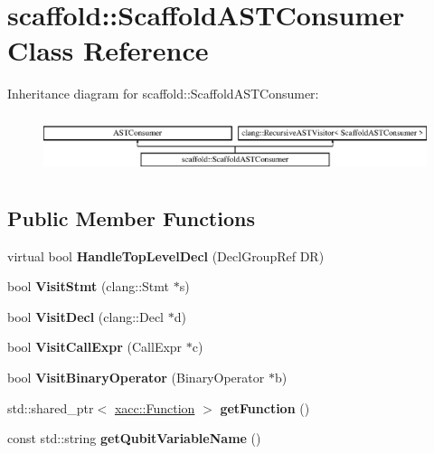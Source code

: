 \hypertarget{a01232}{}\section{scaffold\+:\+:Scaffold\+A\+S\+T\+Consumer Class Reference}
\label{a01232}
Inheritance diagram for scaffold\+:\+:Scaffold\+A\+S\+T\+Consumer\+:\begin{figure}[H]
\begin{center}
\leavevmode
\includegraphics[height=1.717791cm]{a01232}
\end{center}
\end{figure}
\subsection*{Public Member Functions}
\begin{DoxyCompactItemize}
\item 
\mbox{\label{a01232_a14020b09423a4efb0f992ace1d482a57}} 
virtual bool {\bfseries Handle\+Top\+Level\+Decl} (Decl\+Group\+Ref DR)
\item 
\mbox{\label{a01232_a3269dcedd2f3175837a94acbf74901d1}} 
bool {\bfseries Visit\+Stmt} (clang\+::\+Stmt $\ast$s)
\item 
\mbox{\label{a01232_aa1c7cd8940ee725b88cc84256d19f555}} 
bool {\bfseries Visit\+Decl} (clang\+::\+Decl $\ast$d)
\item 
\mbox{\label{a01232_a91844fe528e854e205429f3b5d2b0e47}} 
bool {\bfseries Visit\+Call\+Expr} (Call\+Expr $\ast$c)
\item 
\mbox{\label{a01232_a598a634d96ffb4217bb0938720e669d2}} 
bool {\bfseries Visit\+Binary\+Operator} (Binary\+Operator $\ast$b)
\item 
\mbox{\label{a01232_a76277d0f3010fb735623f620d79f7128}} 
std\+::shared\+\_\+ptr$<$ \hyperlink{a02456}{xacc\+::\+Function} $>$ {\bfseries get\+Function} ()
\item 
\mbox{\label{a01232_ab1d779aee8690e77e7c9a89f93c41a1f}} 
const std\+::string {\bfseries get\+Qubit\+Variable\+Name} ()
\end{DoxyCompactItemize}
